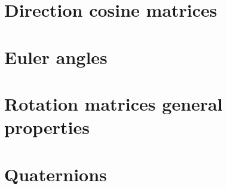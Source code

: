 \section{Direction cosine matrices}

\section{Euler angles}

\section{Rotation matrices general properties}

\section{Quaternions}